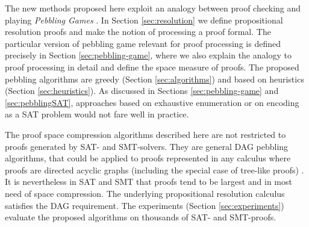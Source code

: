 The new methods proposed here exploit an analogy between proof checking and playing \emph{Pebbling Games} \cite{Kasai1979,Gilbert1980}.
In Section \ref{sec:resolution} we define propositional resolution proofs and make the notion of processing a proof formal.
The particular version of pebbling game relevant for proof processing is defined precisely in Section \ref{sec:pebbling-game}, where we also explain the analogy to proof processing in detail and define the space measure of proofs. The proposed pebbling algorithms are greedy (Section \ref{sec:algorithms}) and based on heuristics (Section \ref{sec:heuristics}). As discussed in Sections \ref{sec:pebbling-game} and \ref{sec:pebblingSAT}, approaches based on exhaustive enumeration or on encoding as a SAT problem would not fare well in practice.

The proof space compression algorithms described here are not restricted to proofs generated by SAT- and SMT-solvers. They are general DAG pebbling algorithms, that could be applied to proofs represented in any calculus where proofs are directed acyclic graphs (including the special case of tree-like proofs) \cite{APPA}. It is nevertheless in SAT and SMT that proofs tend to be largest and in most need of space compression. The underlying propositional resolution calculus satisfies the DAG requirement. The experiments (Section \ref{sec:experiments}) evaluate the proposed algorithms on thousands of SAT- and SMT-proofs.


